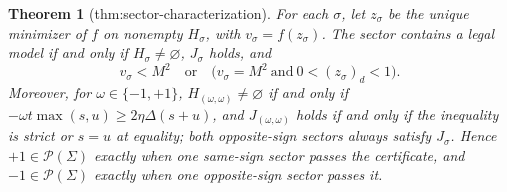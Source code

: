 \documentclass{article}
\newtheorem{theorem}{Theorem}
\begin{document}
\begin{theorem}[thm:sector-characterization]\label{thm:sector-characterization}
For each \(\sigma\), let \(z_{\sigma}\) be the unique minimizer of \(f\) on nonempty \(H_{\sigma}\), with \(v_{\sigma}=f(z_{\sigma})\). The sector contains a legal model if and only if \(H_{\sigma}\ne\varnothing\), \(J_{\sigma}\) holds, and \[v_{\sigma}<M^2\quad\text{or}\quad\bigl(v_{\sigma}=M^2\ \text{and}\ 0<(z_{\sigma})_d<1\bigr).\] Moreover, for \(\omega\in\{-1,+1\}\), \(H_{(\omega,\omega)}\ne\varnothing\) if and only if \(-\omega t\max(s,u)\ge2\eta\Delta(s+u)\), and \(J_{(\omega,\omega)}\) holds if and only if the inequality is strict or \(s=u\) at equality; both opposite-sign sectors always satisfy \(J_{\sigma}\). Hence \(+1\in\mathcal P(\Sigma)\) exactly when one same-sign sector passes the certificate, and \(-1\in\mathcal P(\Sigma)\) exactly when one opposite-sign sector passes it.
\end{theorem}
\end{document}

